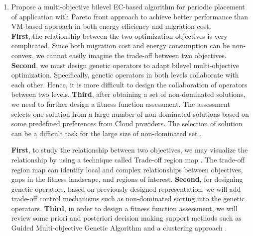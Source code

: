 \begin{enumerate}

	\item Propose a multi-objective bilevel EC-based algorithm for periodic placement of application with Pareto front approach to achieve better performance than VM-based approach in both energy efficiency and migration cost.\\

	 \textbf{First}, the relationship between the two optimization objectives is very complicated. Since both migration cost and energy consumption can be non-convex, we cannot easily imagine the trade-off between two objectives. \textbf{Second}, we must design genetic operators to adapt bilevel multi-objective optimization. Specifically, genetic operators in both levels collaborate with each other. Hence, it is more difficult to design the collaboration of operators between two levels.  \textbf{Third}, after obtaining a set of non-dominated solutions, we need to further design a fitness function assessment. The assessment selects one solution from a large number of non-dominated solutions based on some predefined preferences from Cloud providers. The selection of solution can be a difficult task for the large size of non-dominated set \cite{Zio:2012jz}. 

	 \textbf{First}, to study the relationship between two objectives, we may visualize the relationship by using a technique called Trade-off region map \cite{Pinheiro:2015eu}. The trade-off region map can identify local and complex relationships between objectives, gaps in the fitness landscape, and regions of interest. \textbf{Second}, for designing genetic operators, based on previously designed representation, we will add trade-off control mechanisms such as non-dominated sorting into the genetic operators. \textbf{Third}, in order to design a fitness function assessment, we will review some priori and posteriori decision making support methods such as Guided Multi-objective Genetic Algorithm \cite{Jat:2011us} and a clustering approach \cite{Zio:2011iq}.



\end{enumerate}

